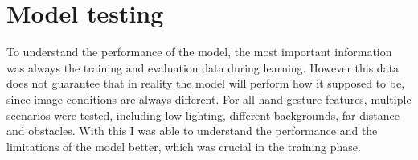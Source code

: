\section{Model testing}
\label{sec:testingsec3}

\par To understand the performance of the model, the most important information was always the training and evaluation data during learning. However this data does not guarantee that in reality the model will perform how it supposed to be, since image conditions are always different. For all hand gesture features, multiple scenarios were tested, including low lighting, different backgrounds, far distance and obstacles. With this I was able to understand the performance and the limitations of the model better, which was crucial in the training phase.